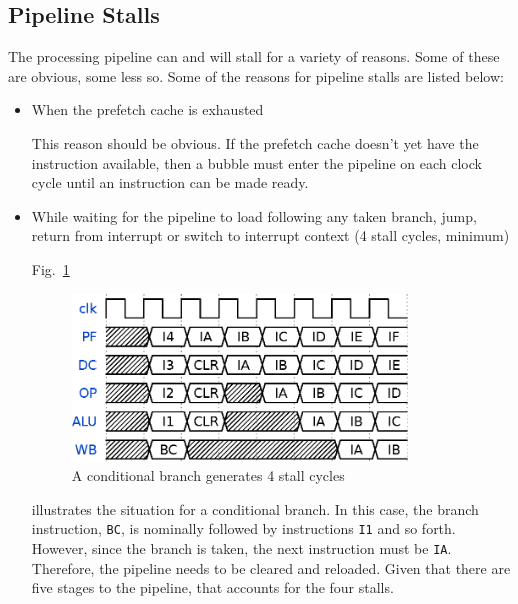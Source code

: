 \documentclass{gqtekspec}
\begin{document}
\subsection{Pipeline Stalls}
The processing pipeline can and will stall for a variety of reasons.  Some of
these are obvious, some less so.  Some of the reasons for pipeline stalls are
listed below:
\begin{itemize}
\item When the prefetch cache is exhausted

	This reason should be obvious.  If the prefetch cache doesn't yet have
	the instruction available, then a bubble must enter the pipeline on
	each clock cycle until an instruction can be made ready.

\item While waiting for the pipeline to load following any taken branch, jump,
	return from interrupt or switch to interrupt context (4 stall cycles,
	minimum)

Fig.~\ref{fig:bcstalls}
\begin{figure}\begin{center}
\includegraphics[width=3.5in]{../gfx/bc.eps}
\caption{A conditional branch generates 4 stall cycles}\label{fig:bcstalls}
\end{center}\end{figure}
illustrates the situation for a conditional branch.  In this case, the branch
instruction, {\tt BC}, is nominally followed by instructions {\tt I1} and so
forth.  However, since the branch is taken, the next instruction must be
{\tt IA}.  Therefore, the pipeline needs to be cleared and reloaded.  Given
that there are five stages to the pipeline, that accounts for the four stalls.


\end{itemize}
\end{document}
